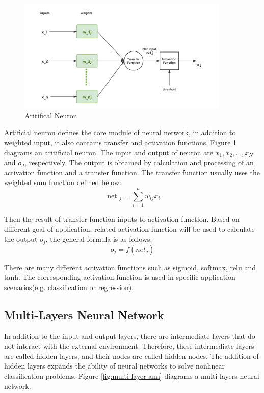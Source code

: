 \begin{figure}[htbp]
\centering
\includegraphics[width=0.9\textwidth]{./images/neuron.png}
\caption{Aritifical Neuron}
\label{fig:neuron}
\end{figure}
Artificial neuron defines the core module of neural network, in addition to weighted input, it also contains transfer and activation functions. Figure \ref{fig:neuron} diagrams an aritificial neuron. The input and output of neuron are $x_1, x_2, \dots, x_N$ and $o_J$, respectively. The output is obtained by calculation and processing of an activation function and a transfer function. The transfer function usually uses the weighted sum function defined below:
\begin{equation}
\text { net }_{j}=\sum_{i=1}^{n} w_{i j} x_{i}
\end{equation}

Then the result of transfer function inputs to activation function. Based on different goal of application, related activation function will be used to calculate the output $o_j$, the general formula is as follows:
\begin{equation}
o_j = f(net_j)
\end{equation}

There are many different activation functions such as sigmoid, softmax, relu and tanh. The corresponding activation function is used in specific application scenarios(e.g. classification or regression).

\subsection{Multi-Layers Neural Network}
In addition to the input and output layers, there are intermediate layers that do not interact with the external environment. Therefore, these intermediate layers are called hidden layers, and their nodes are called hidden nodes. The addition of hidden layers expands the ability of neural networks to solve nonlinear classification problems\parencite{BASHEER20003}. Figure \ref{fig:multi-layer-ann} diagrams a multi-layers neural network.

